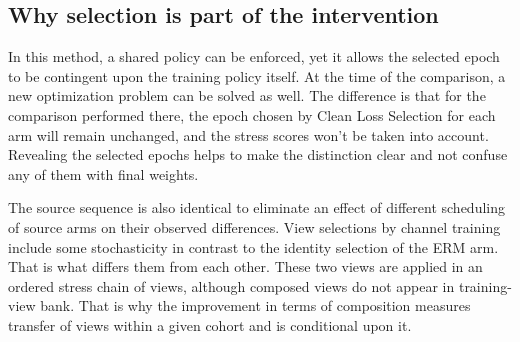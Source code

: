 \subsection{Why selection is part of the intervention}

In this method, a shared policy can be enforced, yet it allows the selected epoch to be contingent upon the training policy itself. At the time of the comparison, a new optimization problem can be solved as well. The difference is that for the comparison performed there, the epoch chosen by Clean Loss Selection for each arm will remain unchanged, and the stress scores won't be taken into account. Revealing the selected epochs helps to make the distinction clear and not confuse any of them with final weights.

The source sequence is also identical to eliminate an effect of different scheduling of source arms on their observed differences. View selections by channel training include some stochasticity in contrast to the identity selection of the ERM arm. That is what differs them from each other. These two views are applied in an ordered stress chain of views, although composed views do not appear in training-view bank. That is why the improvement in terms of composition measures transfer of views within a given cohort and is conditional upon it.
